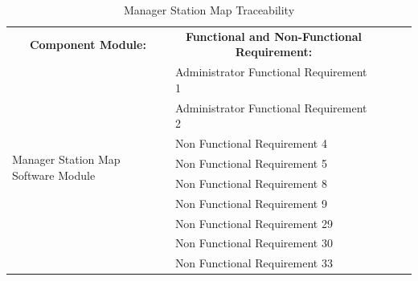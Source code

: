 \documentclass [10pt]{article}
\begin{document}
\pagebreak


\begin{table}[h!]
\centering
\begin{tabular}{lllll}
\cline{1-2}
\multicolumn{1}{|c|}{\textbf{Component Module:}} & \multicolumn{1}{c|}{\textbf{Functional and Non-Functional Requirement:}} &  &  &  \\ \cline{1-2}
\multicolumn{1}{|l|}{\multirow{9}{*}{Manager Station Map Software Module}} & \multicolumn{1}{l|}{Administrator Functional Requirement 1} &  &  &  \\ \cline{2-2}
\multicolumn{1}{|l|}{} & \multicolumn{1}{l|}{Administrator Functional Requirement 2} &  &  &  \\ \cline{2-2}
\multicolumn{1}{|l|}{} & \multicolumn{1}{l|}{Non Functional Requirement 4} &  &  &  \\ \cline{2-2}
\multicolumn{1}{|l|}{} & \multicolumn{1}{l|}{Non Functional Requirement 5} &  &  &  \\ \cline{2-2}
\multicolumn{1}{|l|}{} & \multicolumn{1}{l|}{Non Functional Requirement 8} &  &  &  \\ \cline{2-2}
\multicolumn{1}{|l|}{} & \multicolumn{1}{l|}{Non Functional Requirement 9} &  &  &  \\ \cline{2-2}
\multicolumn{1}{|l|}{} & \multicolumn{1}{l|}{Non Functional Requirement 29} &  &  &  \\ \cline{2-2}
\multicolumn{1}{|l|}{} & \multicolumn{1}{l|}{Non Functional Requirement 30} &  &  &  \\ \cline{2-2}
\multicolumn{1}{|l|}{} & \multicolumn{1}{l|}{Non Functional Requirement 33} &  &  &  \\ \cline{1-2}
\end{tabular}
\caption{Manager Station Map Traceability}
\end{table}
\end{document}
